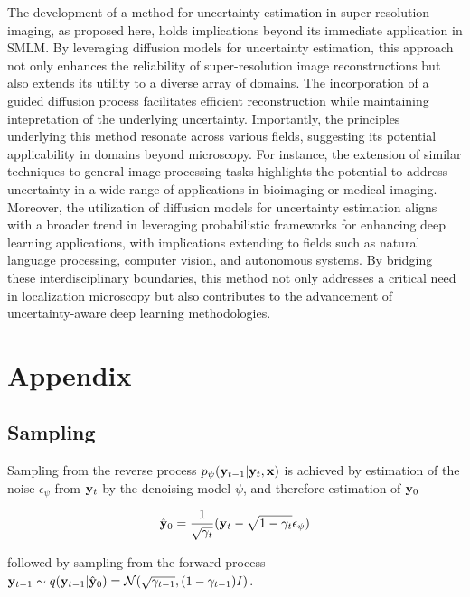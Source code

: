 The development of a method for uncertainty estimation in super-resolution imaging, as proposed here, holds implications beyond its immediate application in SMLM. By leveraging diffusion models for uncertainty estimation, this approach not only enhances the reliability of super-resolution image reconstructions but also extends its utility to a diverse array of domains. The incorporation of a guided diffusion process facilitates efficient reconstruction while maintaining intepretation of the underlying uncertainty. Importantly, the principles underlying this method resonate across various fields, suggesting its potential applicability in domains beyond microscopy. For instance, the extension of similar techniques to general image processing tasks highlights the potential to address uncertainty in a wide range of applications in bioimaging or medical imaging. Moreover, the utilization of diffusion models for uncertainty estimation aligns with a broader trend in leveraging probabilistic frameworks for enhancing deep learning applications, with implications extending to fields such as natural language processing, computer vision, and autonomous systems. By bridging these interdisciplinary boundaries, this method not only addresses a critical need in localization microscopy but also contributes to the advancement of uncertainty-aware deep learning methodologies.


\section{Appendix}

\subsection{Sampling}

Sampling from the reverse process $p_{\psi}(\bold{y}_{t-1}\lvert\bold{y}_{t},\bold{x})$ is achieved by estimation of the noise $\epsilon_{\psi}$ from $\bold{y}_{t}$ by the denoising model $\psi$, and therefore estimation of $\bold{y}_{0}$

\begin{equation}
\hat{\bold{y}}_{0} = \frac{1}{\sqrt{\gamma_{t}}}(\bold{y}_{t} - \sqrt{1-\gamma_{t}}\epsilon_{\psi})
\end{equation}

followed by sampling from the forward process $\bold{y}_{t-1} \sim q(\bold{y}_{t-1}\lvert\hat{\bold{y}}_{0}) = \mathcal{N}(\sqrt{\gamma_{t-1}},(1-\gamma_{t-1})I)$. 


